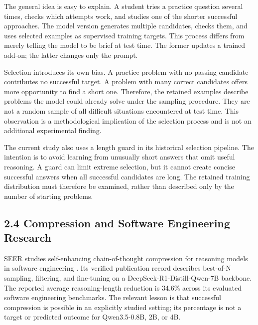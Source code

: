 \documentclass[11pt,letterpaper]{article}
\begin{document}
The general idea is easy to explain. A student tries a practice question several times, checks which attempts work, and studies one of the shorter successful approaches. The model version generates multiple candidates, checks them, and uses selected examples as supervised training targets. This process differs from merely telling the model to be brief at test time. The former updates a trained add-on; the latter changes only the prompt.\par

Selection introduces its own bias. A practice problem with no passing candidate contributes no successful target. A problem with many correct candidates offers more opportunity to find a short one. Therefore, the retained examples describe problems the model could already solve under the sampling procedure. They are not a random sample of all difficult situations encountered at test time. This observation is a methodological implication of the selection process and is not an additional experimental finding.\par

The current study also uses a length guard in its historical selection pipeline. The intention is to avoid learning from unusually short answers that omit useful reasoning. A guard can limit extreme selection, but it cannot create concise successful answers when all successful candidates are long. The retained training distribution must therefore be examined, rather than described only by the number of starting problems.\par

\subsection*{2.4 Compression and Software Engineering Research}

SEER studies self-enhancing chain-of-thought compression for reasoning models in software engineering \cite{seer}. Its verified publication record describes best-of-N sampling, filtering, and fine-tuning on a DeepSeek-R1-Distill-Qwen-7B backbone. The reported average reasoning-length reduction is 34.6\% across its evaluated software engineering benchmarks. The relevant lesson is that successful compression is possible in an explicitly studied setting; its percentage is not a target or predicted outcome for Qwen3.5-0.8B, 2B, or 4B.\par
\end{document}
